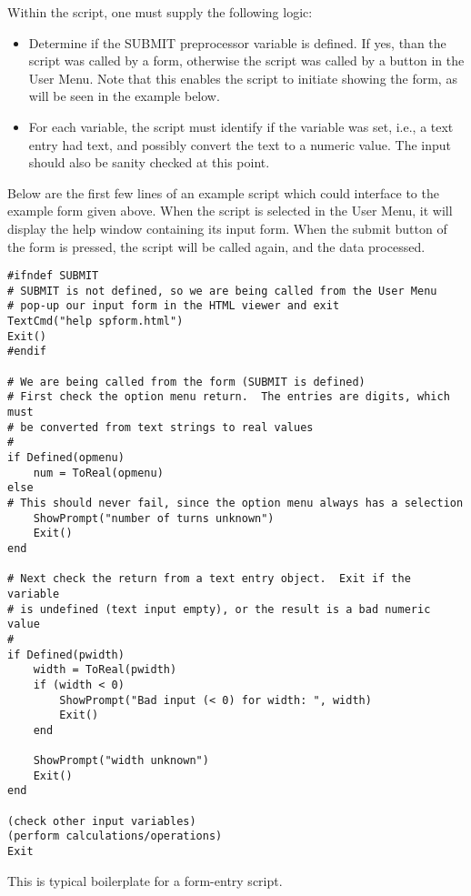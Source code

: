 Within the script, one must supply the following logic:

\begin{itemize}
\item Determine if the SUBMIT preprocessor variable is defined.  If
yes, than the script was called by a form, otherwise the script was
called by a button in the {\cb User Menu}.  Note that this enables
the script to initiate showing the form, as will be seen in the
example below.
\item For each variable, the script must identify if the variable
was set, i.e., a text entry had text, and possibly convert the
text to a numeric value.  The input should also be sanity checked
at this point.
\end{itemize}

Below are the first few lines of an example script which could
interface to the example form given above.  When the script is
selected in the {\cb User Menu}, it will display the help window
containing its input form.  When the {\cb submit} button of the form
is pressed, the script will be called again, and the data processed.

\begin{verbatim}
#ifndef SUBMIT
# SUBMIT is not defined, so we are being called from the User Menu
# pop-up our input form in the HTML viewer and exit
TextCmd("help spform.html")
Exit()
#endif

# We are being called from the form (SUBMIT is defined)
# First check the option menu return.  The entries are digits, which must
# be converted from text strings to real values
#
if Defined(opmenu)
    num = ToReal(opmenu)
else
# This should never fail, since the option menu always has a selection
    ShowPrompt("number of turns unknown")
    Exit()
end

# Next check the return from a text entry object.  Exit if the variable
# is undefined (text input empty), or the result is a bad numeric value
#
if Defined(pwidth)
    width = ToReal(pwidth)
    if (width < 0)
        ShowPrompt("Bad input (< 0) for width: ", width)
        Exit()
    end
 
    ShowPrompt("width unknown")
    Exit()
end

(check other input variables)
(perform calculations/operations)
Exit
\end{verbatim}

This is typical boilerplate for a form-entry script.


